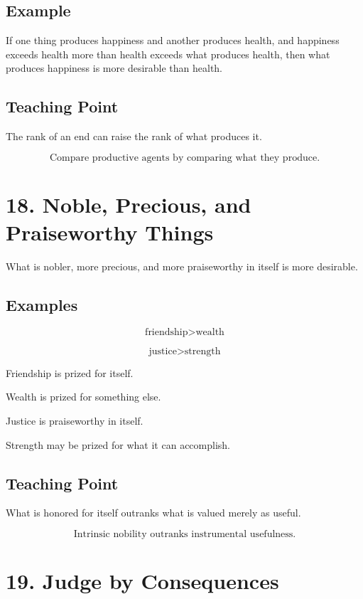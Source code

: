 \documentclass[12pt]{article}
\begin{document}
\subsection*{Example}

If one thing produces happiness and another produces health, and happiness
exceeds health more than health exceeds what produces health, then what
produces happiness is more desirable than health.

\subsection*{Teaching Point}

The rank of an end can raise the rank of what produces it.

\[
\boxed{
\text{Compare productive agents by comparing what they produce.}
}
\]

\section*{18. Noble, Precious, and Praiseworthy Things}

What is nobler, more precious, and more praiseworthy in itself is more
desirable.

\subsection*{Examples}

\[
\text{friendship} > \text{wealth}
\]

\[
\text{justice} > \text{strength}
\]

Friendship is prized for itself.

Wealth is prized for something else.

Justice is praiseworthy in itself.

Strength may be prized for what it can accomplish.

\subsection*{Teaching Point}

What is honored for itself outranks what is valued merely as useful.

\[
\boxed{
\text{Intrinsic nobility outranks instrumental usefulness.}
}
\]

\section*{19. Judge by Consequences}
\end{document}
